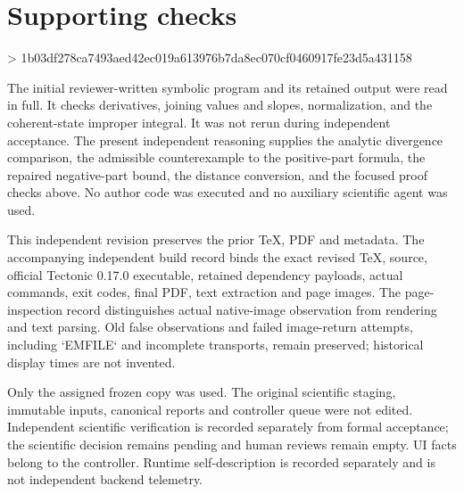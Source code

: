 \documentclass[10pt]{article}
\begin{document}
\section*{Supporting checks}
> 1b03df278ca7493aed42ec019a613976b7da8ec070cf0460917fe23d5a431158\par
The initial reviewer-written symbolic program and its retained output were read in full. It checks derivatives, joining values and slopes, normalization, and the coherent-state improper integral. It was not rerun during independent acceptance. The present independent reasoning supplies the analytic divergence comparison, the admissible counterexample to the positive-part formula, the repaired negative-part bound, the distance conversion, and the focused proof checks above. No author code was executed and no auxiliary scientific agent was used.\par
This independent revision preserves the prior TeX, PDF and metadata. The accompanying independent build record binds the exact revised TeX, source, official Tectonic 0.17.0 executable, retained dependency payloads, actual commands, exit codes, final PDF, text extraction and page images. The page-inspection record distinguishes actual native-image observation from rendering and text parsing. Old false observations and failed image-return attempts, including `EMFILE` and incomplete transports, remain preserved; historical display times are not invented.\par
Only the assigned frozen copy was used. The original scientific staging, immutable inputs, canonical reports and controller queue were not edited. Independent scientific verification is recorded separately from formal acceptance; the scientific decision remains pending and human reviews remain empty. UI facts belong to the controller. Runtime self-description is recorded separately and is not independent backend telemetry.\par
\end{document}
